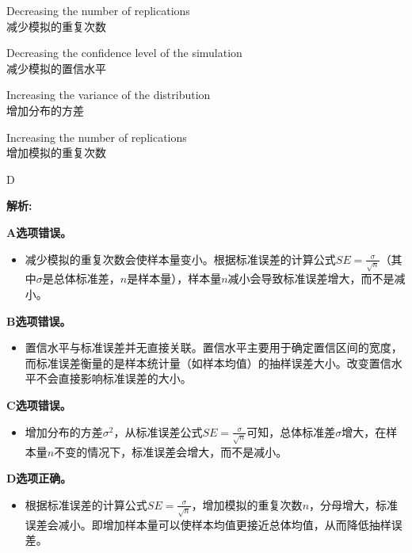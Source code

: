 \documentclass{article}
\newenvironment{explanation}
{\textbf{解析:}\par}
{\par}
\begin{document}
    \begin{choices}
        \item Decreasing the number of replications\\
        减少模拟的重复次数
        \item Decreasing the confidence level of the simulation\\
        减少模拟的置信水平
        \item Increasing the variance of the distribution\\
        增加分布的方差
        \item Increasing the number of replications\\
        增加模拟的重复次数
    \end{choices}
    
    \begin{correctanswer}
        D
    \end{correctanswer}
    
    \begin{explanation}
    \textbf{A选项错误。}
    \begin{itemize}
        \item 减少模拟的重复次数会使样本量变小。根据标准误差的计算公式\(SE = \frac{\sigma}{\sqrt{n}}\)（其中\(\sigma\)是总体标准差，\(n\)是样本量），样本量\(n\)减小会导致标准误差增大，而不是减小。
    \end{itemize}
    \textbf{B选项错误。}
    \begin{itemize}
        \item 置信水平与标准误差并无直接关联。置信水平主要用于确定置信区间的宽度，而标准误差衡量的是样本统计量（如样本均值）的抽样误差大小。改变置信水平不会直接影响标准误差的大小。
    \end{itemize}
    \textbf{C选项错误。}
    \begin{itemize}
        \item 增加分布的方差\(\sigma^2\)，从标准误差公式\(SE=\frac{\sigma}{\sqrt{n}}\)可知，总体标准差\(\sigma\)增大，在样本量\(n\)不变的情况下，标准误差会增大，而不是减小。
    \end{itemize}
    \textbf{D选项正确。}
    \begin{itemize}
        \item 根据标准误差的计算公式\(SE = \frac{\sigma}{\sqrt{n}}\)，增加模拟的重复次数\(n\)，分母增大，标准误差会减小。即增加样本量可以使样本均值更接近总体均值，从而降低抽样误差。
    \end{itemize}
    \end{explanation}
    
\end{document}
